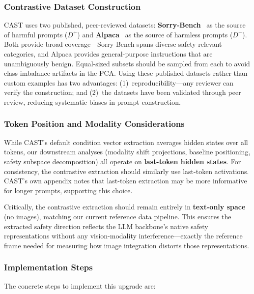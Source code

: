 \documentclass{article}
\begin{document}
\subsubsection*{Contrastive Dataset Construction}

CAST uses two published, peer-reviewed datasets: \textbf{Sorry-Bench}~\citep{xie2024sorrybench}
as the source of harmful prompts ($D^+$) and \textbf{Alpaca}~\citep{taori2023alpaca}
as the source of harmless prompts ($D^-$).  Both provide broad coverage---Sorry-Bench
spans diverse safety-relevant categories, and Alpaca provides general-purpose
instructions that are unambiguously benign.  Equal-sized subsets should be sampled
from each to avoid class imbalance artifacts in the PCA.  Using these published
datasets rather than custom examples has two advantages: (1)~reproducibility---any
reviewer can verify the construction; and (2)~the datasets have been validated
through peer review, reducing systematic biases in prompt construction.

\subsubsection*{Token Position and Modality Considerations}

While CAST's default condition vector extraction averages hidden states over all
tokens, our downstream analyses (modality shift projections, baseline positioning,
safety subspace decomposition) all operate on \textbf{last-token hidden states}.
For consistency, the contrastive extraction should similarly use last-token
activations.  CAST's own appendix notes that last-token extraction may be more
informative for longer prompts, supporting this choice.

Critically, the contrastive extraction should remain entirely in
\textbf{text-only space} (no images), matching our current reference data
pipeline.  This ensures the extracted safety direction reflects the LLM
backbone's native safety representations without any vision-modality
interference---exactly the reference frame needed for measuring how image
integration distorts those representations.

\subsubsection*{Implementation Steps}

The concrete steps to implement this upgrade are:
\end{document}
